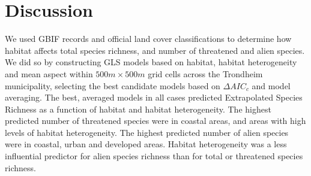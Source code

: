 \documentclass{article}
\begin{document}
\section{Discussion}
We used GBIF records and official land cover classifications to determine how habitat affects total species richness, and number of threatened and alien species. We did so by constructing GLS models based on habitat, habitat heterogeneity and mean aspect within $500 m \times 500 m$ grid cells across the Trondheim municipality, selecting the best candidate models based on $\Delta AIC_c$ and model averaging. The best, averaged models in all cases predicted Extrapolated Species Richness as a function of habitat and habitat heterogeneity. The highest predicted number of threatened species were in coastal areas, and areas with high levels of habitat heterogeneity. The highest predicted number of alien species were in coastal, urban and developed areas. Habitat heterogeneity was a less influential predictor for alien species richness than for total or threatened species richness. 
\end{document}
